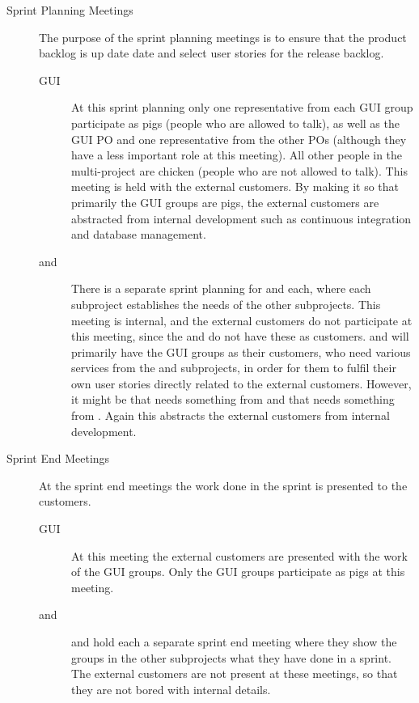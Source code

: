 \begin{description}
  \item[Sprint Planning Meetings]
  The purpose of the sprint planning meetings is to ensure that the product backlog is up date date and select user stories for the release backlog.
  \begin{description}
    \item[GUI] At this sprint planning only one representative from each GUI group participate as pigs (people who are allowed to talk), as well as the GUI PO and one representative from the other POs (although they have a less important role at this meeting). All other people in the multi-project are chicken (people who are not allowed to talk). This meeting is held with the external customers. By making it so that primarily the GUI groups are pigs, the external customers are abstracted from internal development such as continuous integration and database management.
    \item[\db and \bd] There is a separate sprint planning for \db and \bd each, where each subproject establishes the needs of the other subprojects. This meeting is internal, and the external customers do not participate at this meeting, since the \db and \bd do not have these as customers. \db and \bd will primarily have the GUI groups as their customers, who need various services from the \db and \bd subprojects, in order for them to fulfil their own user stories directly related to the external customers. However, it might be that \db needs something from \bd and that \bd needs something from \db. Again this abstracts the external customers from internal development.
  \end{description}
  \item[Sprint End Meetings]
  At the sprint end meetings the work done in the sprint is presented to the customers.
  \begin{description}
    \item[GUI] At this meeting the external customers are presented with the work of the GUI groups. Only the GUI groups participate as pigs at this meeting.
    \item[\db and \bd] \db and \bd hold each a separate sprint end meeting where they show the groups in the other subprojects what they have done in a sprint. The external customers are not present at these meetings, so that they are not bored with internal details.
  \end{description}
\end{description}

